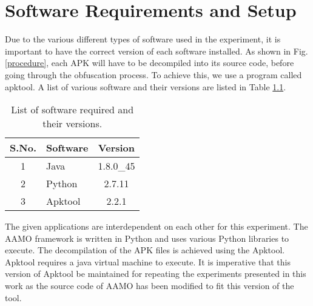 \chapter{Software Requirements and Setup}

Due to the various different types of software used in the experiment, it is important to have the correct version of each software installed. As shown in Fig.\ref{procedure}, each APK will have to be decompiled into its source code, before going through the obfuscation process. To achieve this, we use a program called apktool\cite{apktool}. A list of various software and their versions are listed in Table \ref{versionTable}.

\begin{table}[htb]
	\caption{List of software required and their versions.\label{versionTable}}
	\begin{center}
		\begin{tabular}{c|lc}\hline\hline
			S.No. & \multicolumn{1}{c}{Software} & Version\\ \hline
			1 & Java & 1.8.0\_45 \\
			2 & Python & 2.7.11 \\
			3 & Apktool & 2.2.1 \\
			\hline\hline
		\end{tabular}
	\end{center}
\end{table}

The given applications are interdependent on each other for this experiment. The AAMO framework is written in Python and uses various Python libraries to execute. The decompilation of the APK files is achieved using the Apktool. Apktool requires a java virtual machine to execute. It is imperative that this version of Apktool be maintained for repeating the experiments presented in this work as the source code of AAMO has been modified to fit this version of the tool.